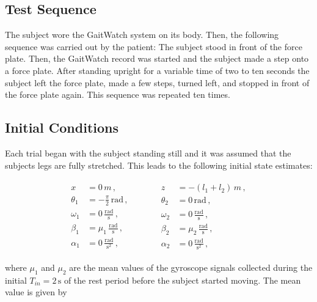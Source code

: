 \subsection{Test Sequence}

The subject wore the GaitWatch system on its body. Then, the following sequence was carried out by the patient: The subject stood in front of the force plate. Then, the GaitWatch record was started and the subject made a step onto a force plate. After standing upright for a variable time of two to ten seconds the subject left the force plate, made a few steps, turned left, and stopped in front of the force plate again. This sequence was repeated ten times.

\subsection{Initial Conditions}

Each trial began with the subject standing still and it was assumed that the subjects legs are fully stretched. This leads to the following initial state estimates:

\begin{equation}
\begin{matrix}
	\begin{split}
	  x &= 0\,m\,, \\
	  \theta_1 &= -\frac{\pi}{2}\,\mbox{rad}\,, \\
	  \omega_1 &= 0\,\frac{\mbox{rad}}{\mbox{s}}\,, \\
	  \beta_1 &= \mu_1\,\frac{\mbox{rad}}{\mbox{s}}\,, \\
	  \alpha_1 &= 0\,\frac{\mbox{rad}}{\mbox{s}^2}\,,
\end{split} \qquad \quad
    \begin{split}
   	  z &= -(l_1+l_2)\,m\,, \\
	  \theta_2 &= 0\,\mbox{rad}\,, \mathrel{\phantom{\frac{\pi}{2}}}\\
	  \omega_2 &= 0\,\frac{\mbox{rad}}{\mbox{s}}\,, \\
	  \beta_2 &= \mu_2\,\frac{\mbox{rad}}{\mbox{s}}\,, \\
	  \alpha_2 &= 0\,\frac{\mbox{rad}}{\mbox{s}^2}\,,  
\end{split}
\end{matrix}
\end{equation}

\noindent
where $\mu_1$ and $\mu_2$ are the mean values of the gyroscope signals collected during the initial $T_{in}=2\,\mbox{s}$ of the rest period before the subject started moving. The mean value is given by

